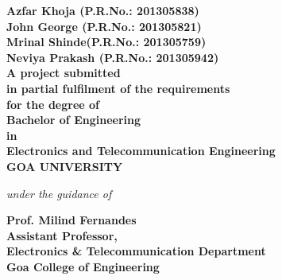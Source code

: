 \begin{center}
\vspace{0.4cm}
\bfseries{Azfar Khoja (P.R.No.: 201305838)\\John George (P.R.No.: 201305821)\\Mrinal Shinde(P.R.No.: 201305759)\\Neviya Prakash (P.R.No.: 201305942)}\\
\vspace{0.4cm}
A project submitted\\in partial fulfilment of the requirements\\for the degree  of\\Bachelor of Engineering\\in\\Electronics and Telecommunication Engineering\\GOA UNIVERSITY\\
\vspace{0.4cm}
\begin{small}
\emph{under the guidance of}\\
\end{small}
\vspace{0.5cm}
{\bfseries \large Prof. Milind Fernandes}\\
{\bfseries \large Assistant Professor,\\Electronics \& Telecommunication Department\\Goa College of Engineering}\\
\vspace{1cm}
\end{center}